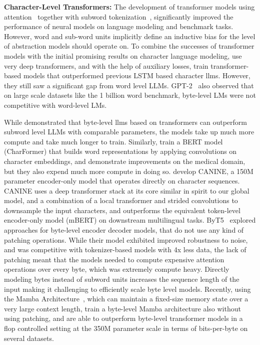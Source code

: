 \textbf{Character-Level Transformers:} The development of transformer models using attention~\citep{vaswani2017attention} together with subword tokenization~\citep{sennrich-etal-2016-neural}, significantly improved the performance of neural models on language modeling and benchmark tasks. However, word and sub-word units implicitly define an inductive bias for the level of abstraction models should operate on. To combine the successes of transformer models with the initial promising results on character language modeling, \citet{al2019character} use very deep transformers, and with the help of auxiliary losses, train transformer-based models that outperformed previous LSTM based character llms. However, they still saw a significant gap from word level LLMs. GPT-2~\citep{radfordgpt2} also observed that on large scale datasets like the 1 billion word benchmark, byte-level LMs were not competitive with word-level LMs. 

While \cite{Choe2019BridgingTG} demonstrated that byte-level llms based on transformers can outperform subword level LLMs with comparable parameters, the models take up much more compute and take much longer to train. Similarly, \cite{el2020characterbert} train a BERT model (CharFormer) that builds word representations by applying convolutions on character embeddings, and demonstrate improvements on the medical domain, but they also expend much more compute in doing so. \cite{clark2022canine} develop CANINE, a 150M parameter encoder-only model that operates directly on character sequences. CANINE uses a deep transformer stack at its core similar in spirit to our global model, and a combination of a local transformer and strided convolutions to downsample the input characters, and outperforms the equivalent token-level encoder-only model (mBERT) on downstream multilingual tasks. ByT5~\citep{xue2022byt5} explored approaches for byte-level encoder decoder models, that do not use any kind of patching operations. While their model exhibited improved robustness to noise, and was competitive with tokenizer-based models with 4x less data, the lack of patching meant that the models needed to compute expensive attention operations over every byte, which was extremely compute heavy. Directly modeling bytes instead of subword units increases the sequence length of the input making it challenging to efficiently scale byte level models. Recently, using the Mamba Architecture~\citep{gu2023mamba},  which can maintain a fixed-size memory state over a very large context length, \cite{wang2024mambabyte} train a byte-level Mamba architecture also without using patching, and are able to outperform byte-level transformer models in a flop controlled setting at the 350M parameter scale in terms of bits-per-byte on several datasets.  

